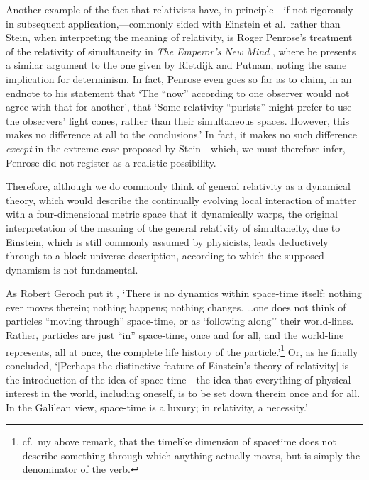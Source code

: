 Another example of the fact that relativists have, in principle---if not rigorously in subsequent application,---commonly sided with Einstein et al.~rather than Stein, when interpreting the meaning of relativity, is Roger Penrose's treatment of the relativity of simultaneity in \textit{The Emperor's New Mind} \cite{Penrose1989}, where he presents a similar argument to the one given by Rietdijk and Putnam, noting the same implication for determinism. In fact, Penrose even goes so far as to claim, in an endnote to his statement that `The ``now'' according to one observer would not agree with that for another', that `Some relativity ``purists'' might prefer to use the observers' light cones, rather than their simultaneous spaces. However, this makes no difference at all to the conclusions.' In fact, it makes no such difference \textit{except} in the extreme case proposed by Stein---which, we must therefore infer, Penrose did not register as a realistic possibility. 

Therefore, although we do commonly think of general relativity as a dynamical theory, which would describe the continually evolving local interaction of matter with a four-dimensional metric space that it dynamically warps, the original interpretation of the meaning of the general relativity of simultaneity, due to Einstein, which is still commonly assumed by physicists, leads deductively through to a block universe description, according to which the supposed dynamism is not fundamental.

As Robert Geroch put it \cite{Geroch1978}, `There is no dynamics within space-time itself: nothing ever moves therein; nothing happens; nothing changes. \ldots one does not think of particles ``moving through'' space-time, or as `following along'' their world-lines. Rather, particles are just ``in'' space-time, once and for all, and the world-line represents, all at once, the complete life history of the particle.'\footnote{cf.~my above remark, that the timelike dimension of spacetime does not describe something through which anything actually moves, but is simply the denominator of the verb.} Or, as he finally concluded, `[Perhaps the distinctive feature of Einstein's theory of relativity] is the introduction of the idea of space-time---the idea that everything of physical interest in the world, including oneself, is to be set down therein once and for all. In the Galilean view, space-time is a luxury; in relativity, a necessity.'

